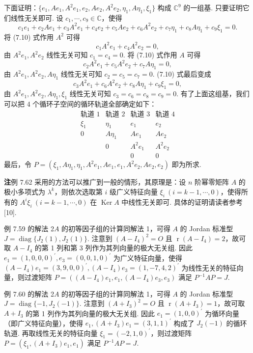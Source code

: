 \documentclass[UTF8, 12pt, fontset=fandol, oneside]{ctexart}
\begin{document}
下面证明：$\{e_1,Ae_1,A^2e_1,e_2,Ae_2,A^2e_2,\eta_1,A\eta_1,\xi_1\}$ 构成 $\mathbb{C}^9$ 的一组基. 只要证明它们线性无关即可. 设 $c_1,\cdots,c_9\in\mathbb{C}$，使得
\begin{equation}
c_1e_1+c_2Ae_1+c_3A^2e_1+c_4e_2+c_5Ae_2+c_6A^2e_2+c_7\eta_1+c_8A\eta_1+c_9\xi_1=0.
\tag{7.10}
\end{equation}
将 (7.10) 式作用 $A^2$ 可得
\[
c_1A^2e_1+c_4A^2e_2=0,
\]
由 $A^2e_1,A^2e_2$ 线性无关可知 $c_1=c_4=0$. 将 (7.10) 式作用 $A$ 可得
\[
c_2A^2e_1+c_5A^2e_2+c_7A\eta_1=0,
\]
由 $A^2e_1,A^2e_2,A\eta_1$ 线性无关可知 $c_2=c_5=c_7=0$. (7.10) 式最后变成
\[
c_3A^2e_1+c_6A^2e_2+c_8A\eta_1+c_9\xi_1=0,
\]
由 $A^2e_1,A^2e_2,A\eta_1,\xi_1$ 线性无关可知 $c_3=c_6=c_8=c_9=0$. 有了上面这组基，我们可以把 4 个循环子空间的循环轨道全部确定如下：
\[
\begin{array}{cccc}
\text{轨道 1} & \text{轨道 2} & \text{轨道 3} & \text{轨道 4}\\
\xi_1 & \eta_1 & e_1 & e_2\\
0 & A\eta_1 & Ae_1 & Ae_2\\
 & 0 & A^2e_1 & A^2e_2\\
 & & 0 & 0
\end{array}
\]
最后，令 $P=(\xi_1,A\eta_1,\eta_1,A^2e_1,Ae_1,e_1,A^2e_2,Ae_2,e_2)$ 即为所求.

\noindent\textbf{注}\quad 例 7.62 采用的方法可以推广到一般的情形，其原理是：设 $n$ 阶幂零矩阵 $A$ 的极小多项式为 $\lambda^k$，则依次选取第 $i$ 级广义特征向量 $\xi_i\ (i=k-1,\cdots,0)$，使得所有的 $A^i\xi_i\ (i=k-1,\cdots,0)$ 在 $\operatorname{Ker}A$ 中线性无关即可. 具体的证明请读者参考 [10].

例 7.59 的解法 2\quad $A$ 的初等因子组的计算同解法 1，可得 $A$ 的 Jordan 标准型 $J=\operatorname{diag}\{J_2(1),J_2(1)\}$. 注意到 $(A-I_4)^2=O$ 且 $\operatorname{r}(A-I_4)=2$，故可取 $A-I_4$ 的第 1 列和第 3 列作为其列向量的极大无关组. 因此 $e_1=(1,0,0,0)^{\prime},e_3=(0,0,1,0)^{\prime}$ 为广义特征向量，使得 $(A-I_4)e_1=(3,9,0,0)^{\prime},(A-I_4)e_3=(1,-7,4,2)^{\prime}$ 为线性无关的特征向量，则过渡矩阵 $P=((A-I_4)e_1,e_1,(A-I_4)e_3,e_3)$ 满足 $P^{-1}AP=J$.

例 7.60 的解法 2\quad $A$ 的初等因子组的计算同解法 1，可得 $A$ 的 Jordan 标准型 $J=\operatorname{diag}\{-1,J_2(-1)\}$. 注意到 $(A+I_3)^2=O$ 且 $\operatorname{r}(A+I_3)=1$，故可取 $A+I_3$ 的第 1 列作为其列向量的极大无关组. 因此 $e_1=(1,0,0)^{\prime}$ 为循环向量（即广义特征向量），使得 $e_1,(A+I_3)e_1=(3,1,1)^{\prime}$ 构成了 $J_2(-1)$ 的循环轨道. 再取线性无关的特征向量 $\xi_1=(-2,1,0)^{\prime}$，则过渡矩阵 $P=(\xi_1,(A+I_3)e_1,e_1)$ 满足 $P^{-1}AP=J$.
\end{document}
